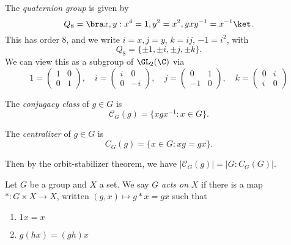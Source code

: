 \documentclass[a4paper]{article}
\begin{document}
\begin{defi}
  The \emph{quaternion group} is given by
  \[
    Q_8 = \bra x, y: x^4 = 1, y^2 = x^2, yxy^{-1} = x^{-1}\ket.
  \]
  This has order $8$, and we write $i = x, j = y$, $k = ij$, $-1 = i^2$, with
  \[
    Q_8 = \{\pm 1, \pm i, \pm j, \pm k\}.
  \]
  We can view this as a subgroup of $\GL_2(\C)$ via
  \[
    1 = \begin{pmatrix}
      1&0\\0&1
    \end{pmatrix},\quad
    i = \begin{pmatrix}
      i & 0\\0&-i
    \end{pmatrix},\quad
    j = \begin{pmatrix}
      0&1\\-1&0
    \end{pmatrix},\quad
    k = \begin{pmatrix}
      0&i\\i&0
    \end{pmatrix}
  \]
\end{defi}

\begin{defi}
  The \emph{conjugacy class} of $g \in G$ is
  \[
    \mathcal{C}_G(g)=\{xgx^{-1}: x \in G\}.
  \]
\end{defi}

\begin{defi}[Centralizer]
  The \emph{centralizer} of $g \in G$ is
  \[
    C_G(g) = \{x \in G: xg = gx\}.
  \]
\end{defi}
Then by the orbit-stabilizer theorem, we have $|\mathcal{C}_G(g)| = |G: C_G(G)|$.

\begin{defi}
  Let $G$ be a group and $X$ a set. We say $G$ \emph{acts on} $X$ if there is a map $*: G \times X \to X$, written $(g, x) \mapsto g * x = gx$ such that
  \begin{enumerate}
    \item $1x = x$
    \item $g(hx) = (gh)x$
  \end{enumerate}
\end{defi}
\end{document}
